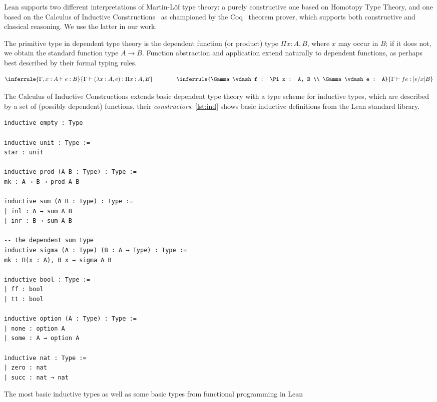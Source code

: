 Lean supports two different interpretations of Martin-Löf type theory:
a purely constructive one based on Homotopy Type Theory, and one based on the
Calculus of Inductive
Constructions~\cite{coquand1988calculus,pfenning1989inductively} as championed
by the Coq~\cite{barras1997coq} theorem prover, which supports both constructive
and classical reasoning. We use the latter in our work.

The primitive type in dependent type theory is the dependent function (or
product) type $\Pi x : A, B$, where $x$ may occur in $B$; if it does not, we
obtain the standard function type $A \rightarrow B$. Function abstraction and
application extend naturally to dependent functions, as perhaps best described
by their formal typing rules.

\[
  \inferrule
    {\Gamma, x : A \vdash e : B}
    {\Gamma \vdash (\lambda x : A, e) : \Pi x : A, B}
  \hspace{4em}
  \inferrule
    {\Gamma \vdash f : \Pi x : A, B \\ \Gamma \vdash e : A}
    {\Gamma \vdash f e : [e/x]B}
\]

The Calculus of Inductive Constructions extends basic dependent type theory with
a type scheme for inductive types, which are described by a set of (possibly
dependent) functions, their \emph{constructors}. \autoref{lst:ind} shows basic
inductive definitions from the Lean standard library.

\begin{listing}[btp]
  \begin{verbatim}
inductive empty : Type

inductive unit : Type :=
star : unit

inductive prod (A B : Type) : Type :=
mk : A → B → prod A B

inductive sum (A B : Type) : Type :=
| inl : A → sum A B
| inr : B → sum A B

-- the dependent sum type
inductive sigma (A : Type) (B : A → Type) : Type :=
mk : Π(x : A), B x → sigma A B

inductive bool : Type :=
| ff : bool
| tt : bool

inductive option (A : Type) : Type :=
| none : option A
| some : A → option A

inductive nat : Type :=
| zero : nat
| succ : nat → nat
  \end{verbatim}

  \caption{The most basic inductive types as well as some basic types from
    functional programming in Lean}
  \label{lst:ind}
\end{listing}

